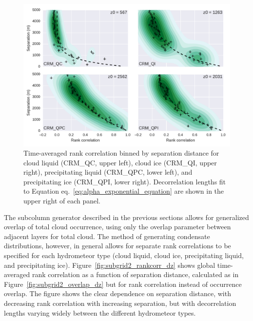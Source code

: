 \begin{figure}[htbp]
\centering
\includegraphics{graphics/subgrid2_rankcorr_dz.pdf}
\caption{\label{fig:subgrid2_rankcorr_dz}Time-averaged rank correlation
binned by separation distance for cloud liquid (CRM\_QC, upper left),
cloud ice (CRM\_QI, upper right), precipitating liquid (CRM\_QPC, lower
left), and precipitating ice (CRM\_QPI, lower right). Decorrelation
lengths fit to Equation eq.~\ref{eq:alpha_exponential_equation} are
shown in the upper right of each
panel.}\label{fig:subgrid2ux5frankcorrux5fdz}
\end{figure}

The subcolumn generator described in the previous sections allows for
generalized overlap of total cloud occurrence, using only the overlap
parameter between adjacent layers for total cloud. The method of
generating condensate distributions, however, in general allows for
separate rank correlations to be specified for each hydrometeor type
(cloud liquid, cloud ice, precipitating liquid, and precipitating ice).
Figure~\ref{fig:subgrid2_rankcorr_dz} shows global time-averaged rank
correlation as a function of separation distance, calculated as in
Figure~\ref{fig:subgrid2_overlap_dz} but for rank correlation instead of
occurrence overlap. The figure shows the clear dependence on separation
distance, with decreasing rank correlation with increasing separation,
but with decorrelation lengths varying widely between the different
hydrometeor types.

